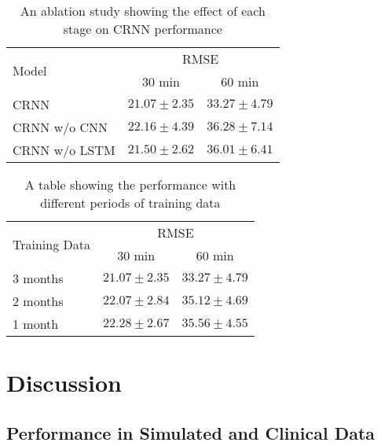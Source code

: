 \documentclass[a4paper, 10 pt, twocolumn]{IEEEtran}
\begin{document}
\begin{table}[ht]
\small{
\caption{An ablation study showing the effect of each stage on CRNN performance }\label{table:SensitivityAnalysis}
\centering
\begin{tabular}{|l|c|c|}
\hline
\multirow{2}{4em}{Model} & \multicolumn{2}{|c|}{RMSE} \\
\cline{2-3}
& 30 min  & 60 min\\
\hline
CRNN  & $21.07 \pm 2.35$ & $33.27\pm 4.79$\\
\hline
CRNN w/o CNN  &$22.16 \pm 4.39$ & $36.28\pm 7.14$\\
\hline
CRNN w/o LSTM  & $21.50 \pm 2.62$ & $36.01\pm 6.41$\\
\hline
\end{tabular}
}
\centering
\end{table}


\begin{table}[ht]
\small{
\caption{A table showing the performance with different periods of training data }\label{table:TrainingData}
\centering
\begin{tabular}{|l|c|c|}
\hline
\multirow{2}{4em}{Training Data} & \multicolumn{2}{|c|}{RMSE} \\
\cline{2-3}
& 30 min  & 60 min \\
\hline
3 months  & $21.07 \pm 2.35$ & $33.27\pm 4.79$\\
\hline
2 months  & $22.07 \pm 2.84$  & $35.12\pm 4.69$\\
\hline
1 month  & $22.28 \pm 2.67$ & $35.56\pm 4.55$\\
\hline
\end{tabular}
}
\centering
\end{table}



\section{Discussion}
\subsection{Performance in Simulated and Clinical Data}
\end{document}
